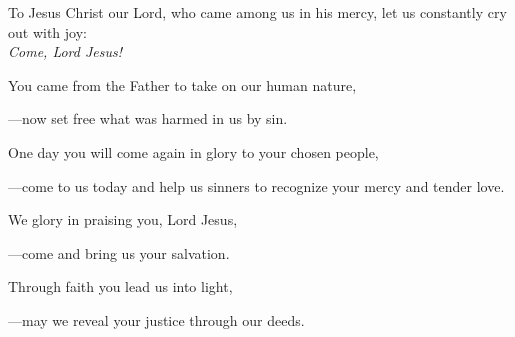 \intercessions\indent

\begin{hangpar}

To Jesus Christ our Lord, who came among us in his mercy, let us constantly cry out with joy:\\
\emph{Come, Lord Jesus!}

\medskip You came from the Father to take on our human nature,

{\color{red}---\thinspace}now set free what was harmed in us by sin.

\medskip One day you will come again in glory to your chosen people,

{\color{red}---\thinspace}come to us today and help us sinners to recognize your mercy and tender love.

\medskip We glory in praising you, Lord Jesus,

{\color{red}---\thinspace}come and bring us your salvation.

\medskip Through faith you lead us into light,

{\color{red}---\thinspace}may we reveal your justice through our deeds.

\medskip

\end{hangpar}